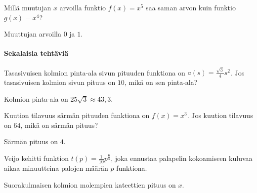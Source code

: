 \begin{tehtavasivu}
\begin{tehtava}
Millä muutujan $x$ arvoilla funktio $ f(x)=x^{5}$ saa saman arvon kuin funktio $ g(x)=x^{4}$?
\begin{vastaus}
Muuttujan arvoilla $0$ ja $1$.
\end{vastaus}
\end{tehtava}

\paragraph*{Sekalaisia tehtäviä}

\begin{tehtava}
Tasasivuisen kolmion pinta-ala sivun pituuden funktiona on $a(s) = \frac{\sqrt{3}}{4}s^{2}$. Jos tasasivuisen kolmion sivun pituus on $10$, mikä on sen pinta-ala?
\begin{vastaus}
Kolmion pinta-ala on $25\sqrt{3}\approx43,3$.
\end{vastaus}
\end{tehtava}

\begin{tehtava}
Kuution tilavuus särmän pituuden funktiona on $f(x) = x^3$. Jos kuution tilavuus on $64$, mikä on särmän pituus?
\begin{vastaus}
Särmän pituus on $4$.
\end{vastaus}
\end{tehtava}

\begin{tehtava}
Veijo kehitti funktion $t(p)=\frac{1}{10}p^{\frac{6}{5}}$, joka ennustaa palapelin kokoamiseen kuluvaa aikaa minuutteina palojen määrän $ p $ funktiona. 
\begin{alakohdat}
\end{alakohdat}
\begin{vastaus}
\begin{alakohdat}
\end{alakohdat}
\end{vastaus}
\end{tehtava}

\begin{tehtava}
Suorakulmaisen kolmion molempien kateettien pituus on $x$.
\begin{alakohdat}
\end{alakohdat}
\begin{vastaus}
\begin{alakohdat}
\end{alakohdat}
\end{vastaus}
\end{tehtava}


\end{tehtavasivu}
